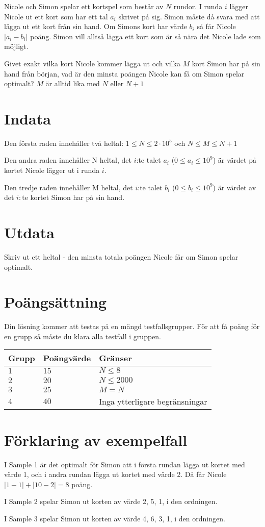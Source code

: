 Nicole och Simon spelar ett kortspel som består av $N$ rundor. I runda $i$ lägger Nicole ut ett kort som har ett tal $a_i$ skrivet på sig. Simon måste då svara med att lägga ut ett kort från sin hand. Om Simons kort har värde $b_i$ så får Nicole $|a_i-b_i|$ poäng. Simon vill alltså lägga ett kort som är så nära det Nicole lade som möjligt.

Givet exakt vilka kort Nicole kommer lägga ut och vilka $M$ kort Simon har på sin hand från början, vad är den minsta poängen Nicole kan få om Simon spelar optimalt? $M$ är alltid lika med $N$ eller $N+1$

\section*{Indata}
Den första raden innehåller två heltal: $1\leq N \leq 2 \cdot 10^5$ och $N\leq M \leq N+1$

Den andra raden innehåller N heltal, det $i$:te talet $a_i$ ($0\le a_i \le 10^9$) är värdet på kortet Nicole lägger ut i runda $i$.

Den tredje raden innehåller M heltal, det $i$:te talet $b_i$ ($0\le b_i \le 10^9$) är värdet av det $i:$te kortet Simon har på sin hand.

\section*{Utdata}
Skriv ut ett heltal - den minsta totala poängen Nicole får om Simon spelar optimalt.

\section*{Poängsättning}
Din lösning kommer att testas på en mängd testfallsgrupper.
För att få poäng för en grupp så måste du klara alla testfall i gruppen.

\noindent
\begin{tabular}{| l | l | p{12cm} |}
  \hline
  Grupp & Poängvärde & Gränser \\ \hline
  $1$   & $15$       & $N \leq 8 $\\ \hline
  $2$   & $20$       & $N \leq 2000 $  \\ \hline
  $3$   & $25$       & $M=N$ \\ \hline
  $4$   & $40$       & Inga ytterligare begränsningar \\ \hline
\end{tabular}

\section*{Förklaring av exempelfall}
I Sample 1 är det optimalt för Simon att i första rundan lägga ut kortet med värde 1, och i andra rundan lägga ut kortet med värde 2. Då får Nicole $|1-1| + |10-2|=8$ poäng.

I Sample 2 spelar Simon ut korten av värde 2, 5, 1, i den ordningen.

I Sample 3 spelar Simon ut korten av värde 4, 6, 3, 1, i den ordningen.